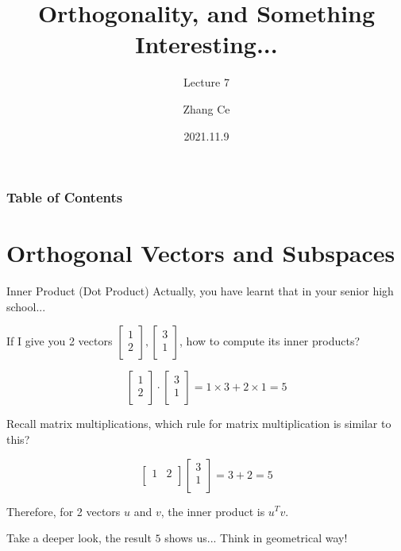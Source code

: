 \documentclass{beamer}
\title[Linear Algebra] %
{Orthogonality, and Something Interesting...}
\subtitle{Lecture 7}
\author[11910803@mail.sustech.edu.cn] %
{
    Zhang Ce
}
\institute[] %
{
    Department of Electrical and Electronic Engineering\\
    Southern University of Science and Technology
}
\date[2021.11.9] %
{2021.11.9}
\begin{document}
\frame{\titlepage}


\begin{frame}
\frametitle{Table of Contents}
\tableofcontents
\end{frame}
\section{Orthogonal Vectors and Subspaces}
\begin{frame}{Inner Product (Dot Product)}
Actually, you have learnt that in your senior high school...

\vspace{3pt}
If I give you 2 vectors $\left[ \begin{array}{c}
	1\\
	2\\
\end{array} \right] ,\left[ \begin{array}{c}
	3\\
	1\\
\end{array} \right]$, how to compute its inner products?

\begin{equation*}
    \left[ \begin{array}{c}
        1\\
        2\\
    \end{array} \right] \cdot \left[ \begin{array}{c}
        3\\
        1\\
    \end{array} \right] =1\times 3+2\times 1=5
\end{equation*}

Recall matrix multiplications, which rule for matrix multiplication is similar to this?

\begin{equation*}
    \left[ \begin{matrix}
        1&		2\\
    \end{matrix} \right] \left[ \begin{array}{c}
        3\\
        1\\
    \end{array} \right] =3+2=5
\end{equation*}

Therefore, for 2 vectors $u$ and $v$, the inner product is $u^Tv$.

\vspace{3pt}
Take a deeper look, the result $5$ shows us... Think in geometrical way!
\end{frame}
\end{document}
